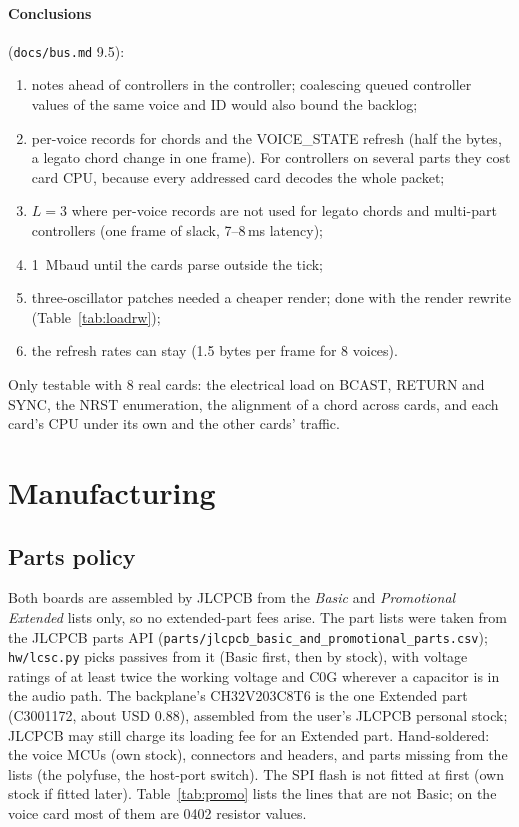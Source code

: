 \documentclass[11pt,a4paper]{article}
\newcommand{\file}[1]{\texttt{#1}}
\begin{document}
\paragraph{Conclusions} (\file{docs/bus.md} 9.5):
\begin{enumerate}
  \item notes ahead of controllers in the controller; coalescing queued controller values of the same voice and ID
    would also bound the backlog;
  \item per-voice records for chords and the VOICE\_STATE refresh (half the bytes, a legato chord change in one
    frame). For controllers on several parts they cost card CPU, because every addressed card decodes the whole packet;
  \item $L = 3$ where per-voice records are not used for legato chords and multi-part controllers (one frame of slack,
    7--8\,ms latency);
  \item \SI{1}{Mbaud} until the cards parse outside the tick;
  \item three-oscillator patches needed a cheaper render; done with the render rewrite (Table~\ref{tab:loadrw});
  \item the refresh rates can stay (1.5 bytes per frame for 8 voices).
\end{enumerate}
Only testable with 8 real cards: the electrical load on BCAST, RETURN and SYNC, the NRST enumeration, the alignment of
a chord across cards, and each card's CPU under its own and the other cards' traffic.

\section{Manufacturing}\label{sec:mfg}

\subsection{Parts policy}
Both boards are assembled by JLCPCB from the \emph{Basic} and \emph{Promotional Extended} lists only, so no
extended-part fees arise. The part lists were taken from the JLCPCB parts API
(\file{parts/jlcpcb\_basic\_and\_promotional\_parts.csv}); \file{hw/lcsc.py} picks passives from it (Basic first, then
by stock), with voltage ratings of at least twice the working voltage and C0G wherever a capacitor is in the audio
path. The backplane's CH32V203C8T6 is the one Extended part (C3001172, about USD 0.88), assembled from the user's
JLCPCB personal stock; JLCPCB may still charge its loading fee for an Extended part. Hand-soldered: the voice MCUs
(own stock), connectors and headers, and parts missing from the lists (the polyfuse, the host-port switch). The SPI
flash is not fitted at first (own stock if fitted later). Table~\ref{tab:promo} lists the lines that are not Basic;
on the voice card most of them are 0402 resistor values.
\end{document}
